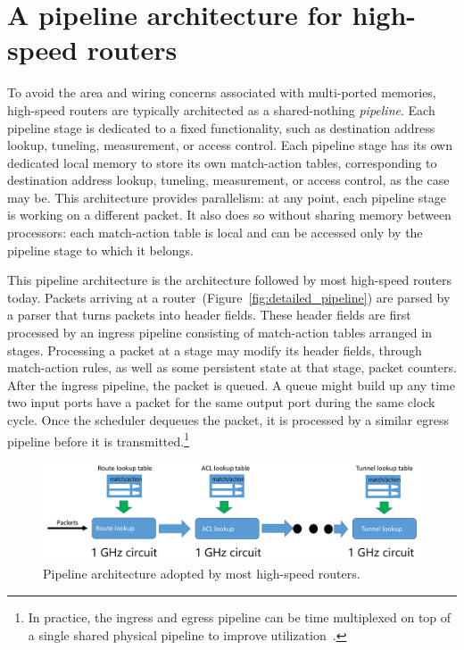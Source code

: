 \section{A pipeline architecture for high-speed routers}
To avoid the area and wiring concerns associated with multi-ported memories,
high-speed routers are typically architected as a shared-nothing {\em
pipeline}. Each pipeline stage is dedicated to a fixed functionality, such as
destination address lookup, tuneling, measurement, or access control. Each
pipeline stage has its own dedicated local memory to store its own match-action
tables, corresponding to destination address lookup, tuneling, measurement, or
access control, as the case may be. This architecture provides parallelism: at
any point, each pipeline stage is working on a different packet. It also does
so without sharing memory between processors: each match-action table is local
and can be accessed only by the pipeline stage to which it belongs.

This pipeline architecture is the architecture followed by most high-speed
routers today. Packets arriving at a
router~(Figure~\ref{fig:detailed_pipeline}) are parsed by a parser that turns
packets into header fields. These header fields are first processed by an
ingress pipeline consisting of match-action tables arranged in stages.
Processing a packet at a stage may modify its header fields, through
match-action rules, as well as some persistent state at that stage, \eg packet
counters. After the ingress pipeline, the packet is queued. A queue might build
up any time two input ports have a packet for the same output port during the
same clock cycle. Once the scheduler dequeues the packet, it is processed by a
similar egress pipeline before it is transmitted.\footnote{In practice, the
ingress and egress pipeline can be time multiplexed on top of a single shared
physical pipeline to improve utilization~\cite{rmt}.}

\begin{figure}[!t]
\includegraphics[width=\textwidth]{pipeline.pdf}
\caption{Pipeline architecture adopted by most high-speed routers.}
\label{fig:pipeline}
\end{figure}

